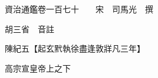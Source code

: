 










 


 
 


 

  
  
  
  
  





  
  
  
  
  
 
  

  

  
  
  



  

 
 

  
   




  

  
  


  　　資治通鑑卷一百七十　　宋　司馬光　撰

　　胡三省　音註

　　陳紀五【起玄黓執徐盡逢敦牂凡三年】

　　高宗宣皇帝上之下

